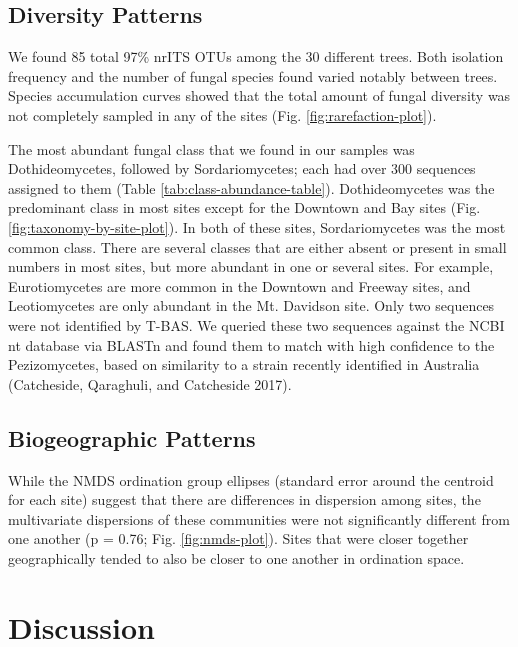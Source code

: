 \documentclass[fleqn,10pt,lineno]{wlpeerj} %
\begin{document}
\hypertarget{diversity-patterns}{%
\subsection*{Diversity Patterns}\label{diversity-patterns}}

We found 85 total 97\% nrITS OTUs among the 30 different trees. Both isolation frequency and the number of fungal species found varied notably between trees. Species accumulation curves showed that the total amount of fungal diversity was not completely sampled in any of the sites (Fig. \ref{fig:rarefaction-plot}).

The most abundant fungal class that we found in our samples was Dothideomycetes, followed by Sordariomycetes; each had over 300 sequences assigned to them (Table \ref{tab:class-abundance-table}). Dothideomycetes was the predominant class in most sites except for the Downtown and Bay sites (Fig. \ref{fig:taxonomy-by-site-plot}). In both of these sites, Sordariomycetes was the most common class. There are several classes that are either absent or present in small numbers in most sites, but more abundant in one or several sites. For example, Eurotiomycetes are more common in the Downtown and Freeway sites, and Leotiomycetes are only abundant in the Mt. Davidson site. Only two sequences were not identified by T-BAS. We queried these two sequences against the NCBI nt database via BLASTn and found them to match with high confidence to the Pezizomycetes, based on similarity to a strain recently identified in Australia (Catcheside, Qaraghuli, and Catcheside 2017).

\hypertarget{biogeographic-patterns}{%
\subsection*{Biogeographic Patterns}\label{biogeographic-patterns}}

While the NMDS ordination group ellipses (standard error around the centroid for each site) suggest that there are differences in dispersion among sites, the multivariate dispersions of these communities were not significantly different from one another (p = 0.76; Fig. \ref{fig:nmds-plot}). Sites that were closer together geographically tended to also be closer to one another in ordination space.

\hypertarget{discussion}{%
\section*{Discussion}\label{discussion}}
\end{document}
